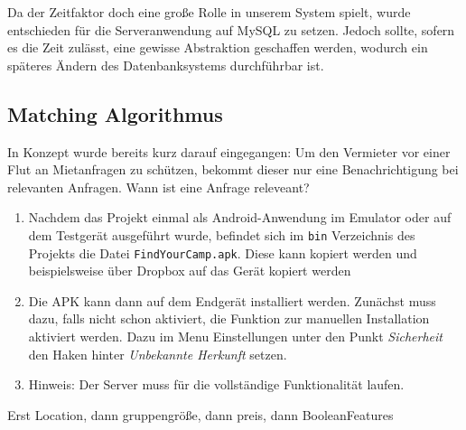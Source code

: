 Da der Zeitfaktor doch eine große Rolle in unserem System spielt, wurde entschieden für die Serveranwendung auf MySQL zu setzen. Jedoch sollte, sofern es die Zeit zulässt, eine gewisse Abstraktion geschaffen werden, wodurch ein späteres Ändern des Datenbanksystems durchführbar ist.

\subsection{Matching Algorithmus}

In Konzept wurde bereits kurz darauf eingegangen: Um den Vermieter vor einer Flut an Mietanfragen zu schützen, bekommt dieser nur eine Benachrichtigung bei relevanten Anfragen. Wann ist eine Anfrage releveant?

\begin{enumerate}
	\item Nachdem das Projekt einmal als Android-Anwendung im Emulator oder auf dem Testgerät ausgeführt wurde, befindet sich im \texttt{bin} Verzeichnis des Projekts die Datei \texttt{FindYourCamp.apk}. Diese kann kopiert werden und beispielsweise über Dropbox auf das Gerät kopiert werden
	\item Die APK kann dann auf dem Endgerät installiert werden. Zunächst muss dazu, falls nicht schon aktiviert, die Funktion zur manuellen Installation aktiviert werden. Dazu im Menu Einstellungen unter den Punkt \textit{Sicherheit} den Haken hinter \textit{Unbekannte Herkunft} setzen.
	\item Hinweis: Der Server muss für die vollständige Funktionalität laufen.
\end{enumerate}


Erst Location, dann gruppengröße, dann preis, dann BooleanFeatures

